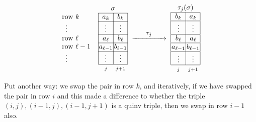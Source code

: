 \begin{defn}
\begin{equation*}
\renewcommand{\arraystretch}{1}  %
\setlength{\arraycolsep}{1pt} %
\begin{array}{l|c|c|}
\multicolumn{1}{c}{}&
\multicolumn{2}{c}{\sigma}
\\
\cline{2-3} %
\text{row } k &  a_k & b_k\\
 \cline{2-3} %
\,\,\,\vdots & \vdots & \vdots \\
\cline{2-3}
\text{row } \ell & a_{\ell} & b_{\ell}\\
\cline{2-3} %
\text{row } \ell-1\,\,\,\,\,\, & a_{\ell-1} & b_{\ell-1}\\
 \cline{2-3}
\,\,\,\vdots & \vdots & \vdots \\
 \cline{2-3}
 \multicolumn{1}{c}{}&
\multicolumn{1}{c}{\scriptstyle j}&
\multicolumn{1}{c}{\scriptstyle j+1}
\end{array}
\,\,\xrightarrow{\makebox[1.5cm]{$\tau_j$}}\,\,
\begin{array}{|c|c|}
\multicolumn{2}{c}{\tau_j(\sigma)}
\\
\hline
b_k &  a_k\\
\hline
\vdots & \vdots \\
\hline
b_{\ell} & a_{\ell}\\
\hline
a_{\ell-1} & b_{\ell-1}\\
\hline
\vdots & \vdots \\
\hline
\multicolumn{1}{c}{\scriptstyle j}&
\multicolumn{1}{c}{\scriptstyle j+1}
\end{array}
\end{equation*}

Put another way: we swap the pair in row $k$, and iteratively, if we have swapped the pair in row $i$ and this made a difference to whether the triple $(i,j), (i-1, j), (i-1, j+1)$ is a quinv
triple, then we swap in row $i-1$ also. 
\end{defn}


